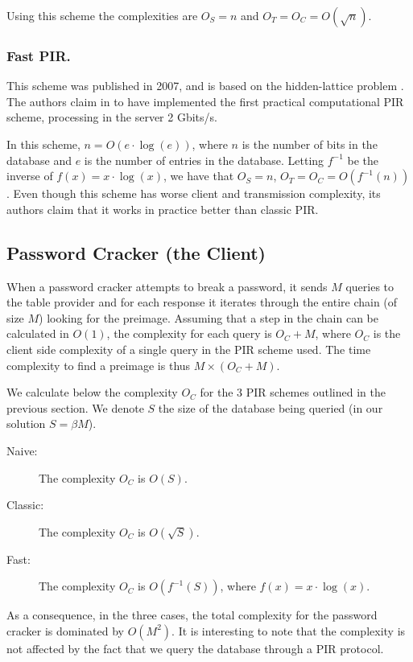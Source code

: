 \documentclass{llncs}
\begin{document}
Using this scheme the complexities are $O_{S}=n$ and $O_{T}=O_{C}=O(\sqrt{n})$.


\subsubsection{Fast PIR.}

This scheme was published in 2007, and is based
on the hidden-lattice problem \cite{paper:ag-07}. 
The authors claim in \cite{paper:a-08} to have implemented the
first practical computational PIR scheme,
processing in the server 2 Gbits/s. 

In this scheme, $n = O(e \cdot \log(e))$, where $n$ is the number of bits
in the database and $e$ is the number of entries in the database.
Letting $f^{-1}$ be the inverse of $f(x) = x \cdot \log(x)$,
we have that $O_{S}=n$, $O_{T}=O_{C}=O(f^{-1}(n))$.
Even though this scheme has worse client and transmission complexity,
its authors claim that it works in practice better than classic PIR.




\subsection{Password Cracker (the Client)} 
\label{sec:password-cracker}

When a password cracker attempts to break a password, it sends $M$
queries to the table provider and for each response it iterates through
the entire chain (of size $M$) looking for the preimage. Assuming that a step in
the chain can be calculated in $O(1)$, the complexity for each query
is $O_{C}+M$, 
where $O_{C}$ is the client side complexity of a single query in
the PIR scheme used.
The time complexity to find a preimage is thus $M \times (O_{C}+M)$.

We calculate below the complexity $O_{C}$ for the 3 PIR schemes outlined in the
previous section. We denote $S$ the size of the database being
queried (in our solution $S = \beta M$).
\begin{description}
\item [{Naive:}] The complexity $O_{C}$ is $O(S)$.
\item [{Classic:}] The complexity $O_{C}$ is $O(\sqrt{S})$.
\item [{Fast:}] The complexity $O_{C}$ is $O(f^{-1}(S))$, where $f(x) = x \cdot \log(x)$.
\end{description}
As a consequence, in the three cases, the total complexity for the password cracker is 
dominated by $O(M^{2})$.
It is interesting to note that the complexity is not affected by
the fact that we query the database through a PIR protocol.
\end{document}
